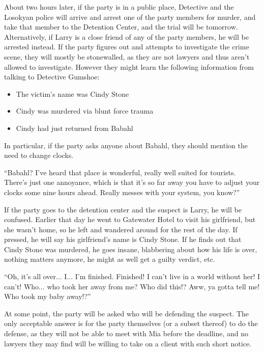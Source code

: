 About two hours later, if the party is in a public place, Detective  and the Losokyan police will arrive and arrest one of the party members for murder, and take that member to the Detention Center, and the trial will be tomorrow. Alternatively, if Larry is a close friend of any of the party members, he will be arrested instead. If the party figures out and attempts to investigate the crime scene, they will mostly be stonewalled, as they are not lawyers and thus aren't allowed to investigate. However they might learn the following information from talking to Detective Gumshoe:
\begin{itemize}
\item The victim's name was Cindy Stone
\item Cindy was murdered via blunt force trauma
\item Cindy had just returned from Babahl
\end{itemize}
In particular, if the party asks anyone about Babahl, they should mention the need to change clocks.
\begin{center}
``Babahl? I've heard that place is wonderful, really well suited for tourists. There's just one annoyance, which is that it's so far away you have to adjust your clocks some nine hours ahead. Really messes with your system, you know?''
\end{center}

If the party goes to the detention center and the suspect is Larry, he will be confused. Earlier that day he went to Gatewater Hotel to visit his girlfriend, but she wasn't home, so he left and wandered around for the rest of the day. If pressed, he will say his girlfriend's name is Cindy Stone. If he finds out that Cindy Stone was murdered, he goes insane, blabbering about how his life is over, nothing matters anymore, he might as well get a guilty verdict, etc. 

\begin{center}
``Oh, it's all over... I... I'm finished. Finished! I can't live in a world without her! I can't! Who... who took her away from me? Who did this!? Aww, ya gotta tell me! Who took my baby away!?''
\end{center}

At some point, the party will be asked who will be defending the suspect. The only acceptable answer is for the party themselves (or a subset thereof) to do the defense, as they will not be able to meet with Mia before the deadline, and no lawyers they may find will be willing to take on a client with such short notice.

